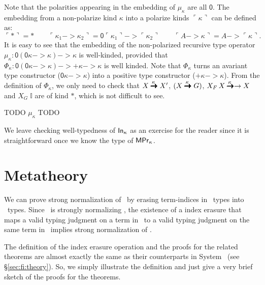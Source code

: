 Note that the polarities appearing in the embedding of $\mu_\kappa$ are all
$\mathsf{0}$. The embedding from a non-polarize kind $\kappa$ into
a polarize kinds $\ulcorner\kappa\urcorner$ can be defined as:
\[ \ulcorner * \urcorner = * \qquad
\ulcorner \kappa_1 -> \kappa_2 \urcorner =
\mathsf{0}\ulcorner\kappa_1\urcorner -> \ulcorner\kappa_2\urcorner \qquad
\ulcorner A -> \kappa \urcorner = A -> \ulcorner \kappa \urcorner.
\]
It is easy to see that the embedding of the non-polarized recursive
type operator $\mu_\kappa : \mathsf{0}(\mathsf{0}\kappa -> \kappa) -> \kappa$
is well-kinded, provided that
$\Phi_\kappa : \mathsf{0}(\mathsf{0}\kappa -> \kappa) -> +\kappa -> \kappa$
is well kinded. Note that $\Phi_\kappa$ turns an avariant type constructor
($\mathsf{0}\kappa -> \kappa$) into a positive type constructor
($+\kappa -> \kappa$). From the definition of $\Phi_\kappa$, we only need 
to check that $X \stackrel{\kappa\;}{\pmb{\pmb{->}}} X'$, $(X \stackrel{\kappa\;}{\pmb{\pmb{->}}} G)$,
$X_F\,X \stackrel{\kappa\;}{\pmb{\pmb{->}}} -> X$ and $X_G\;\mathbb{I}$ are of kind $*$,
which is not difficult to see.

TODO $\mu_\kappa$ TODO

We leave checking well-typedness of $\mathsf{In}_\kappa$ as an exercise for the reader
since it is straightforward once we know the type of $\mathsf{MPr}_\kappa$.


\section{Metatheory} \label{sec:fixi:theory}

We can prove strong normalization of \Fixi\ by erasing term-indices in \Fixi\ 
types into \Fixw\ types. Since \Fixw\ is strongly normalizing \cite{AbeMat04},
the existence of a index erasure that maps a valid typing judgment on a term
in \Fixi\ to a valid typing judgment on the same term in \Fixw\ implies
strong normalization of \Fixi.

The definition of the index erasure operation and the proofs for
the related theorems are almost exactly the same as their counterparts
in System \Fi\ (see \S\ref{sec:fi:theory}). So, we simply illustrate
the definition and just give a very brief sketch of the proofs for the
theorems.

